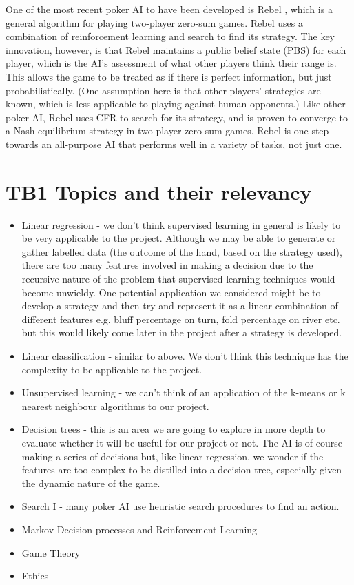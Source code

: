 \documentclass{article}
\begin{document}
\begin{multicols*}{2}
\newline
One of the most recent poker AI to have been developed is Rebel \cite{Rebel1} \cite{Rebel2}, which is a general algorithm for playing two-player zero-sum games. Rebel uses a combination of reinforcement learning and search to find its strategy. The key innovation, however, is that Rebel maintains a public belief state (PBS) for each player, which is the AI’s assessment of what other players think their range is. This allows the game to be treated as if there is perfect information, but just probabilistically. (One assumption here is that other players’ strategies are known, which is less applicable to playing against human opponents.) Like other poker AI, Rebel uses CFR to search for its strategy, and is proven to converge to a Nash equilibrium strategy in two-player zero-sum games. Rebel is one step towards an all-purpose AI that performs well in a variety of tasks, not just one.
\section{TB1 Topics and their relevancy}
\begin{itemize}
    \item Linear regression - we don't think supervised learning in general is likely to be very applicable to the project. Although we may be able to generate or gather labelled data (the outcome of the hand, based on the strategy used), there are too many features involved in making a decision due to the recursive nature of the problem that supervised learning techniques would become unwieldy. One potential application we considered might be to develop a strategy and then try and represent it as a linear combination of different features e.g. bluff percentage on turn, fold percentage on river etc. but this would likely come later in the project after a strategy is developed.
    \item Linear classification - similar to above. We don't think this technique has the complexity to be applicable to the project. 
    \item Unsupervised learning - we can't think of an application of the k-means or k nearest neighbour algorithms to our project.
    \item Decision trees - this is an area we are going to explore in more depth to evaluate whether it will be useful for our project or not. The AI is of course making a series of decisions but, like linear regression, we wonder if the features are too complex to be distilled into a decision tree, especially given the dynamic nature of the game. 
    \item Search I - many poker AI use heuristic search procedures to find an action. 
    \item Markov Decision processes and Reinforcement Learning
    \item Game Theory
    \item Ethics
\end{itemize}

\end{multicols*}
\end{document}
